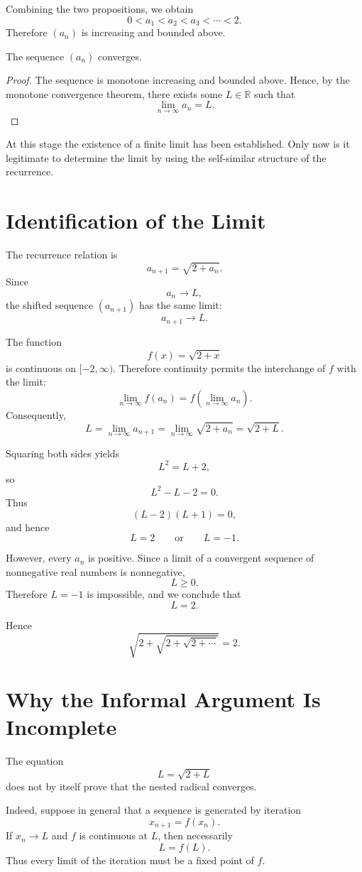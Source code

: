 \documentclass{essay}
\begin{document}
Combining the two propositions, we obtain
\[
0<a_1<a_2<a_3<\cdots<2.
\]
Therefore \((a_n)\) is increasing and bounded above.

\begin{theorem}
The sequence \((a_n)\) converges.
\end{theorem}

\begin{proof}
The sequence is monotone increasing and bounded above. Hence, by the monotone convergence theorem, there exists some \(L\in\mathbb{R}\) such that
\[
\lim_{n\to\infty} a_n=L.
\]
\end{proof}

At this stage the existence of a finite limit has been established. Only now is it legitimate to determine the limit by using the self-similar structure of the recurrence.

\section{Identification of the Limit}

The recurrence relation is
\[
a_{n+1}=\sqrt{2+a_n}.
\]
Since
\[
a_n\to L,
\]
the shifted sequence \((a_{n+1})\) has the same limit:
\[
a_{n+1}\to L.
\]

The function
\[
f(x)=\sqrt{2+x}
\]
is continuous on \([-2,\infty)\). Therefore continuity permits the interchange of \(f\) with the limit:
\[
\lim_{n\to\infty} f(a_n)
=
f\left(\lim_{n\to\infty} a_n\right).
\]
Consequently,
\[
L
=
\lim_{n\to\infty} a_{n+1}
=
\lim_{n\to\infty}\sqrt{2+a_n}
=
\sqrt{2+L}.
\]

Squaring both sides yields
\[
L^2=L+2,
\]
so
\[
L^2-L-2=0.
\]
Thus
\[
(L-2)(L+1)=0,
\]
and hence
\[
L=2
\qquad\text{or}\qquad
L=-1.
\]

However, every \(a_n\) is positive. Since a limit of a convergent sequence of nonnegative real numbers is nonnegative,
\[
L\geq 0.
\]
Therefore \(L=-1\) is impossible, and we conclude that
\[
\boxed{L=2}.
\]

Hence
\[
\boxed{
\sqrt{2+\sqrt{2+\sqrt{2+\cdots}}}=2
}.
\]

\section{Why the Informal Argument Is Incomplete}

The equation
\[
L=\sqrt{2+L}
\]
does not by itself prove that the nested radical converges.

Indeed, suppose in general that a sequence is generated by iteration
\[
x_{n+1}=f(x_n).
\]
If \(x_n\to L\) and \(f\) is continuous at \(L\), then necessarily
\[
L=f(L).
\]
Thus every limit of the iteration must be a fixed point of \(f\).
\end{document}
